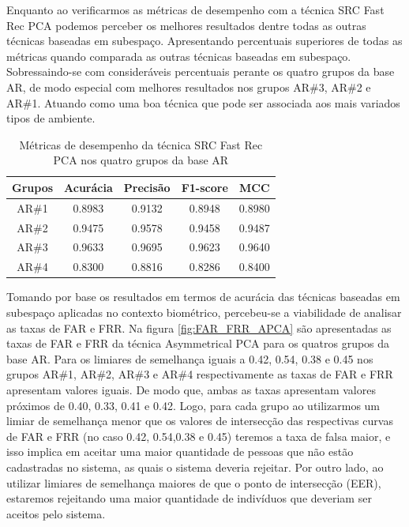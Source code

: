 Enquanto ao verificarmos as métricas de desempenho com a técnica SRC Fast Rec PCA podemos perceber os melhores resultados dentre todas as outras técnicas baseadas em subespaço. Apresentando percentuais superiores de todas as métricas quando comparada as outras técnicas baseadas em subespaço. Sobressaindo-se com consideráveis percentuais perante os quatro grupos da base AR, de modo especial com melhores resultados nos grupos AR\#3, AR\#2 e AR\#1. Atuando como uma boa técnica que pode ser associada aos mais variados tipos de ambiente.


\begin{table}[htpb]
    \centering
	\caption{Métricas de desempenho da técnica SRC Fast Rec PCA nos quatro grupos da base AR}
\begin{tabular}{|c|c|c|c|c|}
\hline
\textbf{Grupos} & \textbf{Acurácia} & \textbf{Precisão} & \textbf{F1-score} & \textbf{MCC} \\\hline
AR\#1	&0.8983	&0.9132	&0.8948&	0.8980\\\hline
AR\#2	&0.9475	&0.9578	&0.9458&	0.9487\\\hline
AR\#3	&0.9633	&0.9695	&0.9623&	0.9640\\\hline
AR\#4	&0.8300	&0.8816	&0.8286&	0.8400\\\hline
\end{tabular}
\label{tab:metricas_src_fast_rec_pca}
\end{table}










Tomando por base os resultados em termos de acurácia das técnicas baseadas em subespaço aplicadas no contexto biométrico, percebeu-se a viabilidade de analisar as taxas de FAR e FRR.
Na figura \ref{fig:FAR_FRR_APCA} são apresentadas as taxas de FAR e FRR da técnica Asymmetrical PCA para os quatros grupos da base AR. Para os limiares de semelhança iguais a 0.42, 0.54, 0.38 e 0.45 nos grupos AR\#1, AR\#2, AR\#3 e AR\#4 respectivamente as taxas de FAR e FRR apresentam valores iguais. De modo que, ambas as taxas apresentam valores próximos de 0.40, 0.33, 0.41 e 0.42. Logo, para cada grupo ao utilizarmos um limiar de semelhança menor que os valores de intersecção das respectivas curvas de FAR e FRR (no caso 0.42, 0.54,0.38 e 0.45) teremos a taxa de falsa maior, e isso implica em aceitar uma maior quantidade de pessoas que não estão cadastradas no sistema, as quais o sistema deveria rejeitar. Por outro lado, ao utilizar limiares de semelhança maiores de que o ponto de intersecção (EER), estaremos rejeitando uma maior quantidade de indivíduos que deveriam ser aceitos pelo sistema.   


